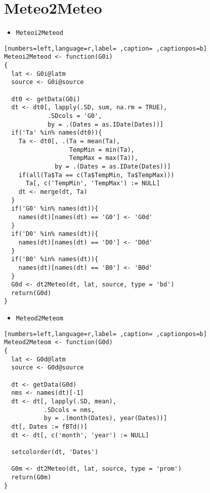 \section{Meteo2Meteo}
\label{sec:orgaea67dd}
\begin{itemize}
\item \texttt{Meteoi2Meteod}
\end{itemize}
\begin{lstlisting}[numbers=left,language=r,label= ,caption= ,captionpos=b]
Meteoi2Meteod <- function(G0i)
{
  lat <- G0i@latm
  source <- G0i@source

  dt0 <- getData(G0i)
  dt <- dt0[, lapply(.SD, sum, na.rm = TRUE),
            .SDcols = 'G0',
            by = .(Dates = as.IDate(Dates))]
  if('Ta' %in% names(dt0)){
    Ta <- dt0[, .(Ta = mean(Ta),
                  TempMin = min(Ta),
                  TempMax = max(Ta)),
              by = .(Dates = as.IDate(Dates))]
    if(all(Ta$Ta == c(Ta$TempMin, Ta$TempMax)))
      Ta[, c('TempMin', 'TempMax') := NULL]
    dt <- merge(dt, Ta)
  }
  if('G0' %in% names(dt)){
    names(dt)[names(dt) == 'G0'] <- 'G0d'
  }
  if('D0' %in% names(dt)){
    names(dt)[names(dt) == 'D0'] <- 'D0d'
  }
  if('B0' %in% names(dt)){
    names(dt)[names(dt) == 'B0'] <- 'B0d'
  }
  G0d <- dt2Meteo(dt, lat, source, type = 'bd')
  return(G0d)
}
\end{lstlisting}
\begin{itemize}
\item \texttt{Meteod2Meteom}
\end{itemize}
\begin{lstlisting}[numbers=left,language=r,label= ,caption= ,captionpos=b]
Meteod2Meteom <- function(G0d)
{
  lat <- G0d@latm
  source <- G0d@source

  dt <- getData(G0d)
  nms <- names(dt)[-1]
  dt <- dt[, lapply(.SD, mean),
           .SDcols = nms,
           by = .(month(Dates), year(Dates))]
  dt[, Dates := fBTd()]
  dt <- dt[, c('month', 'year') := NULL]
  
  setcolorder(dt, 'Dates')

  G0m <- dt2Meteo(dt, lat, source, type = 'prom')
  return(G0m)
}
\end{lstlisting}
